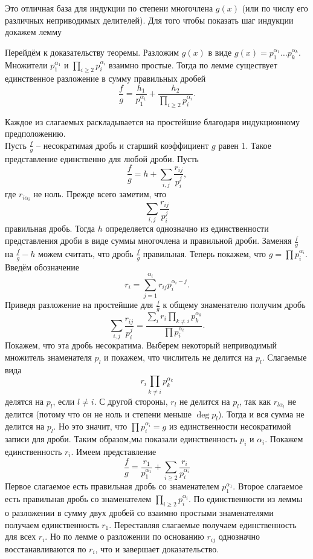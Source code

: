 Это отличная база для индукции по степени многочлена $g(x)$  (или по числу его различных неприводимых делителей). Для того чтобы показать шаг индукции докажем лемму



Перейдём к доказательству теоремы. Разложим $g(x)$ в виде $g(x)=p_1^{\alpha_1}\dots p_k^{\alpha_k}$. Множители $p_1^{\alpha_1}$ и $\prod_{i\geq 2}p_i^{\alpha_i}$ взаимно простые. Тогда по лемме существует единственное разложение в сумму правильных дробей $$\frac{f}{g}=  \frac{h_1}{p_1^{\alpha_1}}+\frac{h_2}{\prod_{i\geq 2}p_i^{\alpha_i}}.$$

Каждое из слагаемых раскладывается на простейшие благодаря индукционному предположению.\\

\proof[Единственность] Пусть $\frac{f}{g}$ -- несократимая дробь и старший коэффициент $g$ равен 1. Такое представление единственно для любой дроби. Пусть
$$\frac{f}{g}=h+\sum_{i,j} \frac{r_{ij}}{p_i^{j}},$$
где $r_{i\alpha_i}$ не ноль. Прежде всего заметим, что $$\sum_{i,j} \frac{r_{ij}}{p_i^{j}}$$
правильная дробь. Тогда $h$ определяется однозначно из единственности представления дроби в виде суммы многочлена и правильной дроби. Заменяя $\frac{f}{g}$ на $\frac{f}{g}-h$ можем считать, что дробь $\frac{f}{g}$ правильная. Теперь  покажем, что  $g=\prod p_i^{\alpha_i}$. Введём обозначение $$r_i= \sum_{j=1}^{\alpha_i} r_{ij} p_i^{\alpha_i-j}.$$
Приведя разложение на простейшие для $\frac{f}{g}$ к общему знаменателю  получим дробь 
$$\sum_{i,j} \frac{r_{ij}}{p_i^{j}}= \frac{\sum_{i} r_{i}\prod_{k\neq i} p_k^{\alpha_{k}}}{\prod p_i^{\alpha_{i}}}.$$
Покажем, что эта дробь несократима. Выберем некоторый неприводимый множитель знаменателя $p_l$ и покажем, что числитель не делится на $p_l$. Слагаемые вида $$r_i \prod_{k\neq i} p_k^{\alpha_{k}}$$ делятся на $p_l$, если $l \neq i$. С другой стороны, $r_l$ не делится на $p_l$, так как $r_{l\alpha_l}$ не делится (потому что он не ноль и степени меньше $\deg p_l$). Тогда и вся сумма не делится на $p_l$.
Но это значит, что $\prod p_i^{\alpha_i}=g$ из единственности несократимой записи для дроби. Таким образом,мы показали единственность $p_i$  и $\alpha_i$. Покажем единственность $r_i$. Имеем представление $$\frac{f}{g}=\frac{r_1}{p_1^{\alpha_1}}+\sum_{i\geq 2} \frac{r_i}{p_i^{\alpha_i}}$$
Первое слагаемое есть правильная дробь со знаменателем $p_1^{\alpha_1}$. Второе слагаемое есть правильная дробь со знаменателем $\prod_{i\geq 2}p_i^{\alpha_i}$. По единственности из леммы о разложении в сумму двух дробей со взаимно простыми знаменателями получаем единственность $r_1$. Переставляя слагаемые получаем единственность для всех $r_i$. Но по лемме о разложении по основанию $r_{ij}$ однозначно восстанавливаются по $r_i$, что и завершает доказательство.
\endproof


